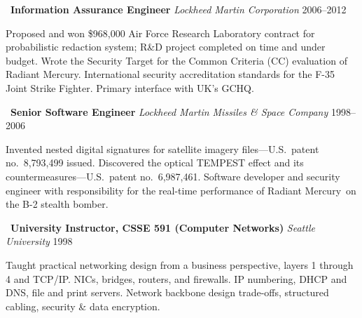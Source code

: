 \vspace{1.5mm}
\noindent\textbullet\ \textbf{Information Assurance Engineer}
    \hfill \emph{Lockheed Martin Corporation} \hfill 2006--2012

    \vspace{1mm}
    \noindent Proposed and won \$968,000 Air Force Research Laboratory
    contract for probabilistic redaction system; R\&D
    project completed on time and under budget. Wrote the
    Security Target for the Common Criteria (CC) evaluation of Radiant
    Mercury\rmtrademark. International security
    accreditation standards for the F-35 Joint Strike Fighter.
    Primary interface with UK's GCHQ.

\vspace{1.5mm}
\noindent\textbullet\ \textbf{Senior Software Engineer}
    \hfill \emph{Lockheed Martin Missiles \& Space Company} \hfill 1998--2006

    \vspace{1mm}
    \noindent Invented nested digital signatures for satellite imagery
    files---U.S.\ patent no.~8,793,499 issued. Discovered the
    optical TEMPEST effect and its countermeasures---U.S.\ patent
    no.~6,987,461. Software developer and security engineer with
    responsibility for the real-time performance of Radiant
    Mercury\rmtrademark\ on the B-2 stealth bomber.

\vspace{1.5mm}
\noindent\textbullet\ \textbf{University Instructor, CSSE 591 (Computer Networks)}
    \hfill \emph{Seattle University} \hfill 1998

    \vspace{1mm}
    \noindent Taught practical networking design from a business perspective, layers
    1 through 4 and TCP/IP. NICs, bridges, routers, and firewalls.
    IP numbering, DHCP and DNS, file and print servers. Network
    backbone design trade-offs, structured cabling, security \& data
    encryption.

